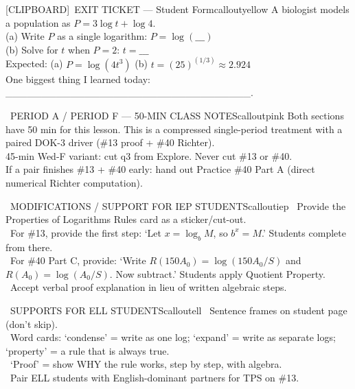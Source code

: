 \documentclass[11pt]{article}
\newcommand{\IconClipboard}{[CLIPBOARD]}
\begin{document}
\begin{callout}{\IconClipboard\ EXIT TICKET --- Student Form}{calloutyellow}
A biologist models a population as \(P = 3\log t + \log 4\).\\
(a) Write \(P\) as a single logarithm: \(P = \log(\_\_\_)\)\\
(b) Solve for \(t\) when \(P = 2\): \(t = \_\_\_\)\\
Expected: (a) \(P = \log(4t^3)\) \hspace{1em} (b) \(t = (25)^{(1/3)} \approx 2.924\)\\
One biggest thing I learned today: \_\_\_\_\_\_\_\_\_\_\_\_\_\_\_\_\_\_\_\_\_\_\_\_\_\_\_\_\_\_\_\_\_\_.
\end{callout}

\clearpage

\begin{callout}{\IconClock\ PERIOD A / PERIOD F --- 50-MIN CLASS NOTES}{calloutpink}
Both sections have 50 min for this lesson. This is a compressed single-period treatment with a paired DOK-3 driver (\#13 proof + \#40 Richter).\\
45-min Wed-F variant: cut q3 from Explore. Never cut \#13 or \#40.\\
If a pair finishes \#13 + \#40 early: hand out Practice \#40 Part A (direct numerical Richter computation).
\end{callout}

\begin{callout}{\IconPuzzle\ MODIFICATIONS / SUPPORT FOR IEP STUDENTS}{calloutiep}
\textbullet\ Provide the Properties of Logarithms Rules card as a sticker/cut-out.\\
\textbullet\ For \#13, provide the first step: `Let \(x = \log_b M\), so \(b^x = M\).' Students complete from there.\\
\textbullet\ For \#40 Part C, provide: `Write \(R(150A_0) = \log(150A_0/S)\) and \(R(A_0) = \log(A_0/S)\). Now subtract.' Students apply Quotient Property.\\
\textbullet\ Accept verbal proof explanation in lieu of written algebraic steps.
\end{callout}

\begin{callout}{\IconGlobe\ SUPPORTS FOR ELL STUDENTS}{calloutell}
\textbullet\ Sentence frames on student page (don't skip).\\
\textbullet\ Word cards: `condense' = write as one log; `expand' = write as separate logs; `property' = a rule that is always true.\\
\textbullet\ `Proof' = show WHY the rule works, step by step, with algebra.\\
\textbullet\ Pair ELL students with English-dominant partners for TPS on \#13.
\end{callout}
\end{document}
